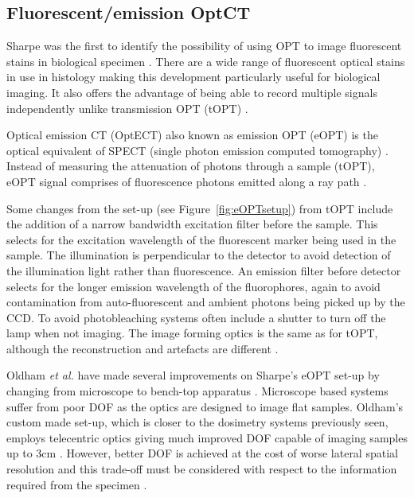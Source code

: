 \documentclass[12pt]{article}
\begin{document}
\subsection{Fluorescent/emission  OptCT}
\label{subsec:eOPT}

Sharpe was the first to identify the possibility of using OPT to image fluorescent stains in biological specimen \cite{Sharpe:2002jp}. There are a wide range of fluorescent optical stains in use in histology making this development particularly useful for biological imaging. It also offers the advantage of being able to record multiple signals independently unlike  transmission OPT (tOPT) \cite{Sharpe:2002jp}. 


Optical emission CT (OptECT) also known as emission OPT (eOPT) is the optical equivalent of SPECT (single photon emission computed tomography) \cite{Oldham:2007ku}.  Instead of measuring the attenuation of photons through a sample (tOPT), eOPT signal comprises of fluorescence photons emitted along a ray path \cite{Walls:2005ja}.



Some changes from the set-up (see Figure~\ref{fig:eOPTsetup}) from tOPT  include the addition of a narrow bandwidth excitation filter before the sample. This selects for the excitation wavelength of the fluorescent marker being used in the sample. The illumination is perpendicular to the detector to avoid detection of the illumination light rather than fluorescence. An emission filter before detector selects for the longer emission wavelength of the fluorophores, again to avoid contamination from auto-fluorescent and ambient photons being picked up by the CCD. To avoid photobleaching systems often include a shutter to turn off the lamp when not imaging.  The image forming optics is the same as for tOPT, although the reconstruction and artefacts are different \cite{Walls:2005ja}.



Oldham \textit{et al.} have made several improvements  on Sharpe's eOPT set-up by changing from microscope to bench-top apparatus \cite{Oldham:2006, Oldham:2007ku}. Microscope based systems suffer from poor DOF as the optics are designed to image flat samples.  Oldham's custom made set-up, which is closer to the dosimetry systems previously seen, employs telecentric optics giving much improved DOF capable of imaging samples up to 3cm \cite{Oldham:2007ku}. However, better DOF is achieved at the cost of worse lateral spatial resolution and this trade-off must be considered with respect to the information required from the specimen \cite{Krstajic:2006kna}.   
\end{document}

